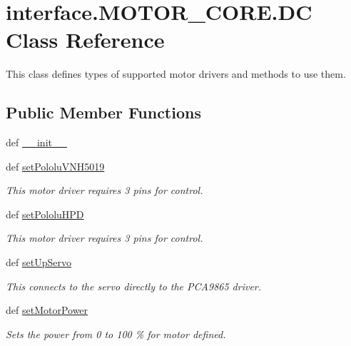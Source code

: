 \hypertarget{classinterface_1_1MOTOR__CORE_1_1DC}{}\section{interface.\+M\+O\+T\+O\+R\+\_\+\+C\+O\+R\+E.\+D\+C Class Reference}
\label{classinterface_1_1MOTOR__CORE_1_1DC}


This class defines types of supported motor drivers and methods to use them.  


\subsection*{Public Member Functions}
\begin{DoxyCompactItemize}
\item 
def \hyperlink{classinterface_1_1MOTOR__CORE_1_1DC_a7adcb2ca9d22b0a94b53a09347f9c2b7}{\+\_\+\+\_\+init\+\_\+\+\_\+}
\item 
def \hyperlink{classinterface_1_1MOTOR__CORE_1_1DC_a07432431affa760aec0760871db95d59}{set\+Pololu\+V\+N\+H5019}
\begin{DoxyCompactList}\small\item\em This motor driver requires 3 pins for control. \end{DoxyCompactList}\item 
def \hyperlink{classinterface_1_1MOTOR__CORE_1_1DC_a562d14585f151182842fe34106a1d88c}{set\+Pololu\+H\+P\+D}
\begin{DoxyCompactList}\small\item\em This motor driver requires 3 pins for control. \end{DoxyCompactList}\item 
def \hyperlink{classinterface_1_1MOTOR__CORE_1_1DC_a11b3993f834e3a032134faacc590ad6a}{set\+Up\+Servo}
\begin{DoxyCompactList}\small\item\em This connects to the servo directly to the P\+C\+A9865 driver. \end{DoxyCompactList}\item 
def \hyperlink{classinterface_1_1MOTOR__CORE_1_1DC_acd058e10f316149548b64f26a75f6dc5}{set\+Motor\+Power}
\begin{DoxyCompactList}\small\item\em Sets the power from 0 to 100 \% for motor defined. \end{DoxyCompactList}\item 

\end{DoxyCompactItemize}
